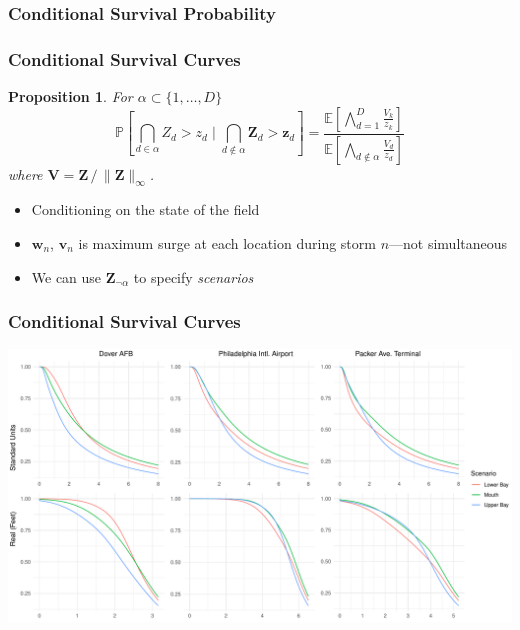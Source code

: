 \documentclass[aspectratio=169,10pt,notes]{beamer}
\newtheorem{prop}{Proposition}
\newlength{\frametextheight}
\begin{document}
\subsubsection{Conditional Survival Probability}

\begin{frame}
    \frametitle{Conditional Survival Curves}
    \begin{prop}
      For $\alpha \subset \lbrace 1, \ldots, D\rbrace$
    \[
        \mathbb{P}\left[\bigcap_{d\in\alpha}Z_{d} > z_d\mid \bigcap_{d\not\in\alpha}\bm{Z}_{d} > \bm{z}_{d}\right] =
        \frac{\mathbb{E}\left[\bigwedge_{d = 1}^D \frac{V_k}{z_k}\right]}{
                      \mathbb{E}\left[\bigwedge_{d\not\in\alpha}\frac{V_d}{z_d}\right]}
    \]
      where $\bm{V} = \bm{Z}\,/\,\lVert\bm{Z}\rVert_{\infty}$.
  \end{prop}
    \begin{itemize}
        \item Conditioning on the state of the field
        \item $\bm{w}_n$, $\bm{v}_n$ is maximum surge at each location during storm $n$---not simultaneous
        \item We can use $\bm{Z}_{\neg\alpha}$ to specify \emph{scenarios}
    \end{itemize}
\end{frame} %

\begin{frame}
    \frametitle{Conditional Survival Curves}
    \begin{center}
        \includegraphics[height=0.99\frametextheight]{./ch3/plots/condsurv/condsurv_1d_mcmc_combined}
    \end{center}
\end{frame} %
\end{document}
